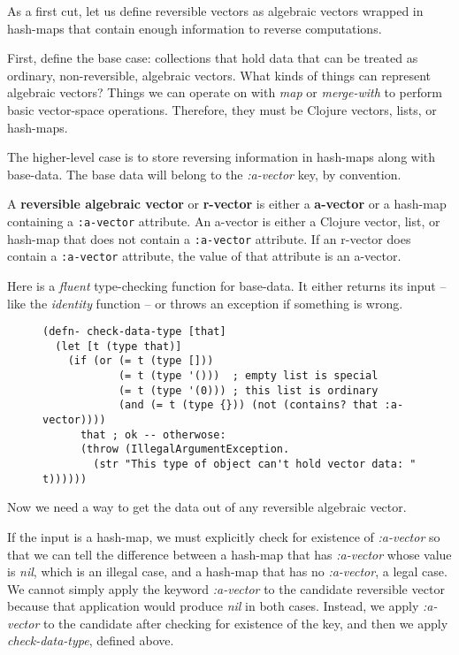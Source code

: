 \documentclass[11pt]{article}
\begin{document}
As a first cut, let us define reversible vectors as algebraic vectors
wrapped in hash-maps that contain enough information to reverse
computations.

First, define the base case: collections that hold data that can be
treated as ordinary, non-reversible, algebraic vectors.  What kinds of
things can represent algebraic vectors?  Things we can operate on with
\emph{map} or \emph{merge-with} to perform basic vector-space operations.
Therefore, they must be Clojure vectors, lists, or hash-maps.

The higher-level case is to store reversing information in hash-maps
along with base-data. The base data will belong to the \emph{:a-vector} key, by
convention.

\begin{mydefinition}
  A \textbf{reversible algebraic vector} or \textbf{r-vector} is either
  a \textbf{a-vector} or a hash-map containing a \texttt{:a-vector}
  attribute. An a-vector is either a Clojure vector, list, or hash-map
  that does not contain a \texttt{:a-vector} attribute. If an r-vector
  does contain a \texttt{:a-vector} attribute, the value of that
  attribute is an a-vector.
\end{mydefinition}

Here is a \emph{fluent} type-checking function for base-data. It either
returns its input -- like the \emph{identity} function -- or throws an
exception if something is wrong.

\begin{figure}[H]
\label{check-data-type}
\begin{verbatim}
(defn- check-data-type [that]
  (let [t (type that)]
    (if (or (= t (type []))
            (= t (type '()))  ; empty list is special
            (= t (type '(0))) ; this list is ordinary
            (and (= t (type {})) (not (contains? that :a-vector))))
      that ; ok -- otherwose:
      (throw (IllegalArgumentException.
        (str "This type of object can't hold vector data: " t))))))
\end{verbatim}
\end{figure}

Now we need a way to get the data out of any reversible algebraic
vector.

If the input is a hash-map, we must explicitly check for existence of
\emph{:a-vector} so that we can tell the difference between a hash-map that has
\emph{:a-vector} whose value is \emph{nil}, which is an illegal case, and a hash-map
that has no \emph{:a-vector}, a legal case. We cannot simply apply the keyword
\emph{:a-vector} to the candidate reversible vector because that application
would produce \emph{nil} in both cases. Instead, we apply \emph{:a-vector} to the
candidate after checking for existence of the key, and then we apply
\emph{check-data-type}, defined above.
\end{document}
